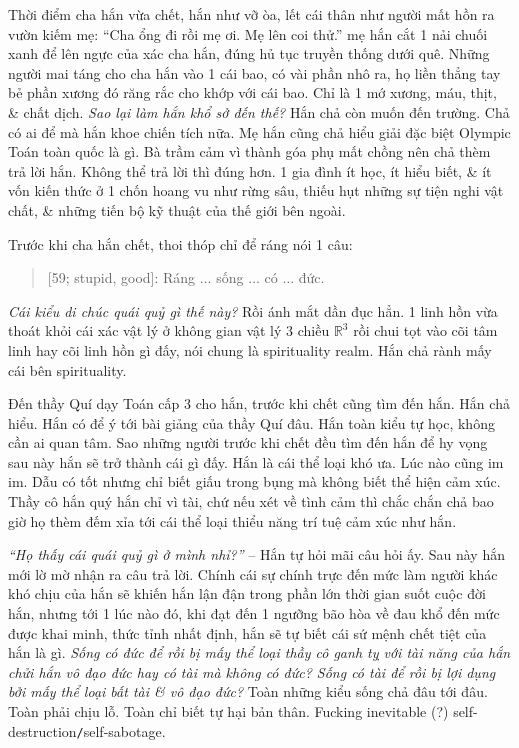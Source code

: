\documentclass[12pt,oneside]{book}
\begin{document}
Thời điểm cha hắn vừa chết, hắn như vỡ òa, lết cái thân như người mất hồn ra vườn kiếm mẹ: ``Cha ổng đi rồi mẹ ơi. Mẹ lên coi thử.'' mẹ hắn cắt 1 nải chuối xanh để lên ngực của xác cha hắn, đúng hủ tục truyền thống dưới quê. Những người mai táng cho cha hắn vào 1 cái bao, có vài phần nhô ra, họ liền thẳng tay bẻ phần xương đó răng rắc cho khớp với cái bao. Chỉ là 1 mớ xương, máu, thịt, \& chất dịch. {\it Sao lại làm hắn khổ sở đến thế?} Hắn chả còn muốn đến trường. Chả có ai để mà hắn khoe chiến tích nữa. Mẹ hắn cũng chả hiểu giải đặc biệt Olympic Toán toàn quốc là gì. Bà trầm cảm vì thành góa phụ mất chồng nên chả thèm trả lời hắn. Không thể trả lời thì đúng hơn. 1 gia đình ít học, ít hiểu biết, \& ít vốn kiến thức ở 1 chốn hoang vu như rừng sâu, thiếu hụt những sự tiện nghi vật chất, \& những tiến bộ kỹ thuật của thế giới bên ngoài.

Trước khi cha hắn chết, thoi thóp chỉ để ráng nói 1 câu:
\begin{quote}
	{ [59; stupid, good]}: Ráng $\ldots$ sống $\ldots$ có $\ldots$ đức.
\end{quote}
{\it Cái kiểu di chúc quái quỷ gì thế này?} Rồi ánh mắt dần đục hẳn. 1 linh hồn vừa thoát khỏi cái xác vật lý ở không gian vật lý 3 chiều $\mathbb{R}^3$ rồi chui tọt vào cõi tâm linh hay cõi linh hồn gì đấy, nói chung là spirituality realm. Hắn chả rành mấy cái bên spirituality.

Đến thầy {\sc Quí} dạy Toán cấp 3 cho hắn, trước khi chết cũng tìm đến hắn. Hắn chả hiểu. Hắn có để ý tới bài giảng của thầy Quí đâu. Hắn toàn kiểu tự học, không cần ai quan tâm. Sao những người trước khi chết đều tìm đến hắn để hy vọng sau này hắn sẽ trở thành cái gì đấy. Hắn là cái thể loại khó ưa. Lúc nào cũng im im. Dẫu có tốt nhưng chỉ biết giấu trong bụng mà không biết thể hiện cảm xúc. Thầy cô hắn quý hắn chỉ vì tài, chứ nếu xét về tình cảm thì chắc chắn chả bao giờ họ thèm đếm xỉa tới cái thể loại thiểu năng trí tuệ cảm xúc như hắn.

{\it``Họ thấy cái quái quỷ gì ở mình nhỉ?''} -- Hắn tự hỏi mãi câu hỏi ấy. Sau này hắn mới lờ mờ nhận ra câu trả lời. Chính cái sự chính trực đến mức làm người khác khó chịu của hắn sẽ khiến hắn lận đận trong phần lớn thời gian suốt cuộc đời hắn, nhưng tới 1 lúc nào đó, khi đạt đến 1 ngưỡng bão hòa về đau khổ đến mức được khai minh, thức tỉnh nhất định, hắn sẽ tự biết cái sứ mệnh chết tiệt của hắn là gì. {\it Sống có đức để rồi bị mấy thể loại thầy cô ganh tỵ với tài năng của hắn chửi hắn vô đạo đức hay có tài mà không có đức? Sống có tài để rồi bị lợi dụng bởi mấy thể loại bất tài \& vô đạo đức?} Toàn những kiểu sống chả đâu tới đâu. Toàn phải chịu lỗ. Toàn chỉ biết tự hại bản thân. Fucking inevitable (?) self-destruction{\tt/}self-sabotage.
\end{document}
